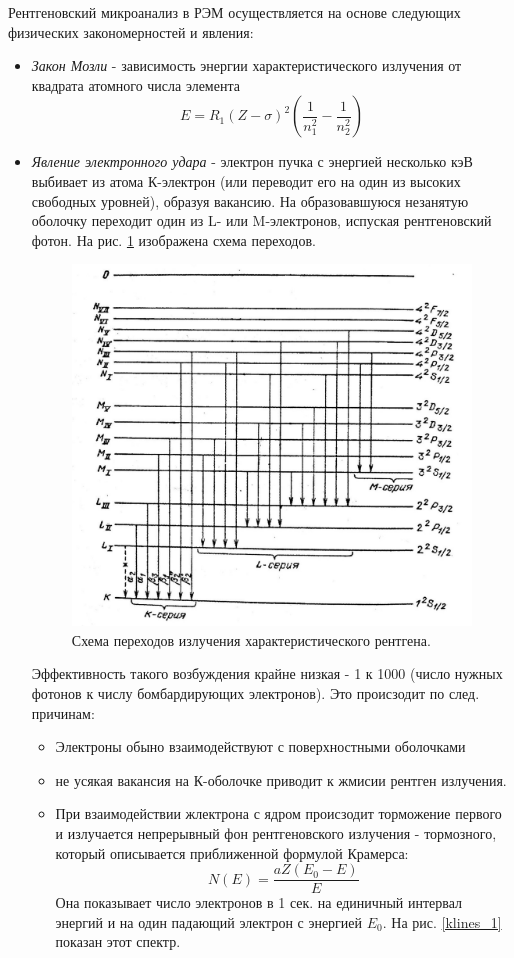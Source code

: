 \documentclass[a4paper]{article}
\begin{document}
Рентгеновский микроанализ в РЭМ осуществляется на основе следующих физических закономерностей и явления:

\begin{itemize}
    \item \textit{Закон Мозли} - зависимость энергии характеристического излучения от квадрата атомного числа элемента
    $$E  = R_1 (Z-\sigma)^2 \left ( \frac{1}{n_1^2} - \frac{1}{n_2^2} \right )$$
    \item \textit{Явление электронного удара} - электрон пучка с энергией несколько кэВ выбивает из атома К-электрон (или переводит его на один из высоких свободных уровней), 
    образуя вакансию. На образовавшуюся незанятую оболочку переходит один из L- или M-электронов, испуская рентгеновский фотон. На рис. \ref{series_1} изображена схема переходов.

    \begin{figure}[H]
        \centering
        \includegraphics[scale = 0.2]{series_1.jpg}
        \caption{Схема переходов излучения характеристического рентгена.}
        \label{series_1}
    \end{figure}

    Эффективность такого возбуждения крайне низкая  - 1 к 1000 (число нужных фотонов к числу бомбардирующих электронов). Это происзодит по след. причинам:

    \begin{itemize}
        \item Электроны обыно взаимодействуют с поверхностными оболочками
        \item не усякая вакансия на К-оболочке приводит к жмисии рентген излучения.
        \item При взаимодействии жлектрона с ядром происзодит торможение первого и излучается непрерывный фон рентгеновского излучения - тормозного, который описывается приближенной формулой
        Крамерса:
        $$N(E) = \frac{a Z (E_0 - E)}{E}$$
        Она показывает число электронов в 1 сек. на единичный интервал энергий и на один падающий электрон с энергией $E_0$. 
        На рис. \ref{klines_1} показан этот спектр.


\end{itemize}
\end{itemize}
\end{document}
